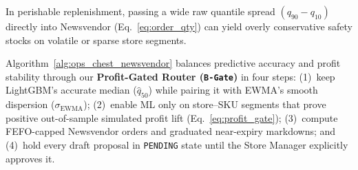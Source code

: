 In perishable replenishment, passing a wide raw quantile spread $(q_{90}-q_{10})$ directly into Newsvendor (Eq.~\ref{eq:order_qty}) can yield overly conservative safety stocks on volatile or sparse store segments.

Algorithm~\ref{alg:ops_chest_newsvendor} balances predictive accuracy and profit stability through our \textbf{Profit-Gated Router (\texttt{B-Gate})} in four steps: (1)~keep LightGBM's accurate median ($\hat{q}_{50}$) while pairing it with EWMA's smooth dispersion ($\sigma_{\text{EWMA}}$); (2)~enable ML only on store--SKU segments that prove positive out-of-sample simulated profit lift (Eq.~\ref{eq:profit_gate}); (3)~compute FEFO-capped Newsvendor orders and graduated near-expiry markdowns; and (4)~hold every draft proposal in \texttt{PENDING} state until the Store Manager explicitly approves it.


